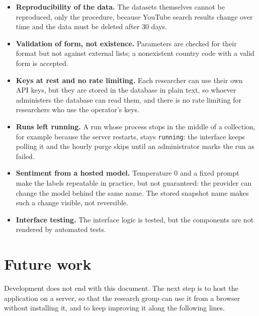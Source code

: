 \begin{itemize}
    \item \textbf{Reproducibility of the data.} The datasets themselves cannot be reproduced, only the procedure, because YouTube search results change over time and the data must be deleted after 30 days.

    \item \textbf{Validation of form, not existence.} Parameters are checked for their format but not against external lists; a nonexistent country code with a valid form is accepted.

    \item \textbf{Keys at rest and no rate limiting.} Each researcher can use their own API keys, but they are stored in the database in plain text, so whoever administers the database can read them, and there is no rate limiting for researchers who use the operator's keys.

    \item \textbf{Runs left running.} A run whose process stops in the middle of a collection, for example because the server restarts, stays \texttt{running}: the interface keeps polling it and the hourly purge skips until an administrator marks the run as failed.

    \item \textbf{Sentiment from a hosted model.} Temperature 0 and a fixed prompt make the labels repeatable in practice, but not guaranteed: the provider can change the model behind the same name. The stored snapshot name makes such a change visible, not reversible.

    \item \textbf{Interface testing.} The interface logic is tested, but the components are not rendered by automated tests.
\end{itemize}

\section{Future work}

Development does not end with this document. The next step is to host the application on a server, so that the research group can use it from a browser without installing it, and to keep improving it along the following lines.

